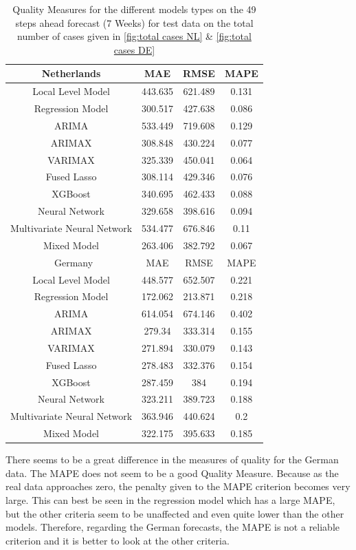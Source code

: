 \begin{table}[]
    \centering
    \begin{tabular}{|c|c c c|}\hline
        Netherlands & MAE & RMSE & MAPE\\\hline
        Local Level Model & 443.635 & 621.489 & 0.131\\
        Regression Model & 300.517 & 427.638 & 0.086\\
        ARIMA & 533.449 & 719.608 & 0.129\\
        ARIMAX & 308.848 & 430.224 & 0.077\\
        VARIMAX & 325.339 & 450.041 & 0.064\\
        Fused Lasso & 308.114 & 429.346 & 0.076\\
        XGBoost & 340.695 & 462.433 & 0.088\\
        Neural Network & 329.658 & 398.616 & 0.094\\
        Multivariate Neural Network & 534.477 & 676.846 & 0.11\\
        Mixed Model & 263.406 & 382.792 & 0.067\\\hline\
        Germany & MAE & RMSE & MAPE\\\hline
        Local Level Model & 448.577 & 652.507 & 0.221\\
        Regression Model & 172.062 & 213.871 & 0.218\\
        ARIMA & 614.054 & 674.146 & 0.402\\
        ARIMAX & 279.34 & 333.314 & 0.155\\
        VARIMAX & 271.894 & 330.079 & 0.143\\
        Fused Lasso & 278.483 & 332.376 & 0.154\\
        XGBoost & 287.459 & 384 & 0.194\\
        Neural Network & 323.211 & 389.723 & 0.188\\
        Multivariate Neural Network & 363.946 & 440.624 & 0.2\\
        Mixed Model & 322.175 & 395.633 & 0.185\\
        \hline
    \end{tabular}
    \caption{Quality Measures for the different models types on the 49 steps ahead forecast (7 Weeks) for test data on the total number of cases given in \autoref{fig:total cases NL} \& \ref{fig:total cases DE}}
    \label{tab:7 weeks ahead}
\end{table}

There seems to be a great difference in the measures of quality for the German data. The MAPE does not seem to be a good Quality Measure. Because as the real data approaches zero, the penalty given to the MAPE criterion becomes very large. This can best be seen in the regression model which has a large MAPE, but the other criteria seem to be unaffected and even quite lower than the other models. Therefore, regarding the German forecasts, the MAPE is not a reliable criterion and it is better to look at the other criteria.\\

